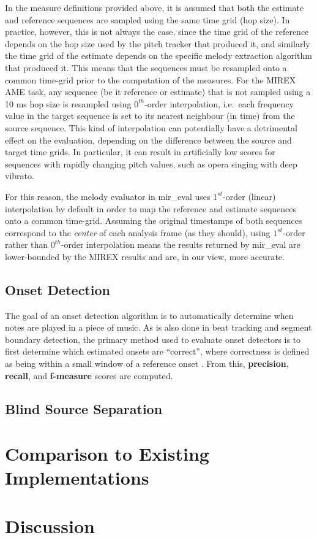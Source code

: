 \documentclass{article}
\begin{document}
In the measure definitions provided above, it is assumed that both the estimate
and reference sequences are sampled using the same time grid (hop size). In
practice, however, this is not always the case, since the time grid of the
reference depends on the hop size used by the pitch tracker that produced
it, and similarly the time grid of the estimate depends on the specific melody
extraction algorithm that produced it. This means that the sequences must be
resampled onto a common time-grid prior to the computation of the measures. For
the MIREX AME task, any sequence (be it reference or estimate) that is not
sampled using a 10 ms hop size is resampled using $0^{th}$-order interpolation,
i.e.~each frequency value in the target sequence is set to its nearest
neighbour (in time) from the source sequence. This kind of interpolation can
potentially have a detrimental effect on the evaluation, depending on the
difference between the source and target time grids. In particular, it can
result in artificially low scores for sequences with rapidly changing pitch
values, such as opera singing with deep vibrato. 

For this reason, the melody evaluator in mir\_eval uses $1^{st}$-order (linear)
interpolation by default in order to map the reference and estimate sequences
onto a common time-grid. Assuming the original timestamps of both sequences
correspond to the \textit{center} of each analysis frame (as they should),
using $1^{st}$-order rather than $0^{th}$-order interpolation means the results
returned by mir\_eval are lower-bounded by the MIREX results and are, in our
view, more accurate.

\subsection{Onset Detection}

The goal of an onset detection algorithm is to automatically determine when notes are played in a piece of music.  As is also done in beat tracking and segment boundary detection, the primary method used to evaluate onset detectors is to first determine which estimated onsets are ``correct'', where correctness is defined as being within a small window of a reference onset \cite{bock2012evaluating}.  From this, \textbf{precision}, \textbf{recall}, and \textbf{f-measure} scores are computed.  

\subsection{Blind Source Separation}


\section{Comparison to Existing Implementations}



\section{Discussion}


\end{document}
